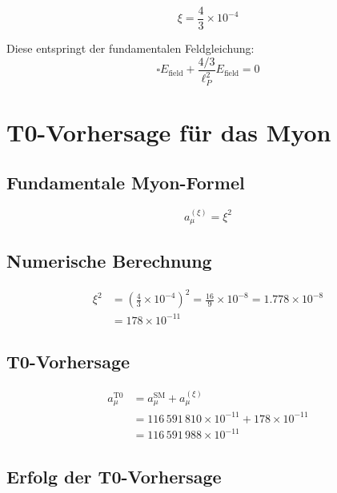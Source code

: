 \documentclass[12pt,a4paper]{article}
\newcommand{\xipar}{\xi}
\begin{document}
	\begin{formel}
		\begin{equation}
			\xipar = \frac{4}{3} \times 10^{-4}
		\end{equation}
	\end{formel}
	
	Diese entspringt der fundamentalen Feldgleichung:
	\begin{equation}
		\square E_{\text{field}} + \frac{4/3}{\ell_P^2} E_{\text{field}} = 0
	\end{equation}
	
	\section{T0-Vorhersage für das Myon}
	
	\subsection{Fundamentale Myon-Formel}
	
	\begin{formel}
		\begin{equation}
			a_\mu^{(\xipar)} = \xipar^2
		\end{equation}
	\end{formel}
	
	\subsection{Numerische Berechnung}
	
	\begin{align}
		\xipar^2 &= \left(\frac{4}{3} \times 10^{-4}\right)^2 = \frac{16}{9} \times 10^{-8} = 1.778 \times 10^{-8} \\
		&= 178 \times 10^{-11}
	\end{align}
	
	\subsection{T0-Vorhersage}
	
	\begin{align}
		a_\mu^{\text{T0}} &= a_\mu^{\text{SM}} + a_\mu^{(\xipar)} \\
		&= 116\,591\,810 \times 10^{-11} + 178 \times 10^{-11} \\
		&= 116\,591\,988 \times 10^{-11}
	\end{align}
	
	\subsection{Erfolg der T0-Vorhersage}
	
\end{document}
